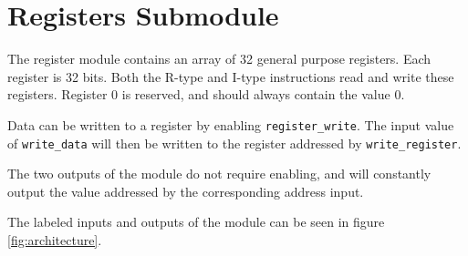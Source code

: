 \section{Registers Submodule}
The register module contains an array of 32 general purpose registers.
Each register is 32 bits.
Both the R-type and I-type instructions read and write these registers.
Register 0 is reserved, and should always contain the value 0.

Data can be written to a register by enabling \texttt{register\_write}.
The input value of \texttt{write\_data} will then be written to the register addressed by \texttt{write\_register}.

The two outputs of the module do not require enabling,
and will constantly output the value addressed by the corresponding address input.

The labeled inputs and outputs of the module can be seen in figure \ref{fig:architecture}.
